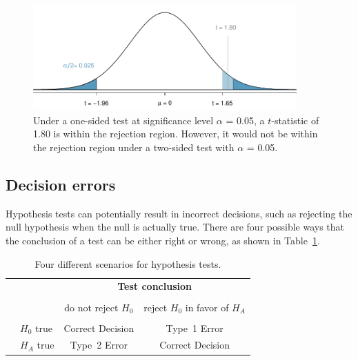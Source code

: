 \begin{spacing}{1.5}
\begin{figure}[h]
	\centering
	\includegraphics[width=0.9\textwidth]
	{ch_inference_foundations_oi_biostat/figures/twoSidedTestConservative/twoSidedTestConservative}
	\caption{Under a one-sided test at significance level $\alpha$ = 0.05, a $t$-statistic of 1.80 is within the rejection region. However, it would not be within the rejection region under a two-sided test with $\alpha$ = 0.05.}
	\label{twoSidedTestConservative}
\end{figure}

\subsection{Decision errors}

Hypothesis tests can potentially result in incorrect decisions, such as rejecting the null hypothesis when the null is actually true. There are four possible ways that the conclusion of a test can be either right or wrong, as shown in Table~\ref{fourHTScenarios}. 

\begin{table}[ht]
	\centering
	\begin{tabular}{l l c c}
		& & \multicolumn{2}{c}{\textbf{Test conclusion}} \\
		\cline{3-4}
		\vspace{-3.7mm} \\
		& & do not reject $H_0$ &  reject $H_0$ in favor of $H_A$ \\
		\cline{2-4}
		\vspace{-3.7mm} \\
		& $H_0$ true & Correct Decision &  Type~1 Error \\
		\raisebox{1.5ex}{\textbf{Truth}} & $H_A$ true & Type~2 Error & Correct Decision\\
		\cline{2-4}
	\end{tabular}
	\caption{Four different scenarios for hypothesis tests.}
	\label{fourHTScenarios}
\end{table}


\end{spacing}
